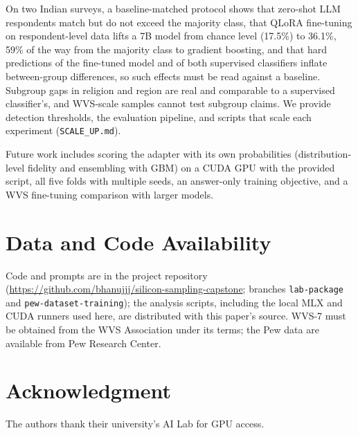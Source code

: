 \documentclass[conference]{IEEEtran}
\begin{document}
On two Indian surveys, a baseline-matched protocol shows that zero-shot LLM respondents match but do not exceed the majority class, that QLoRA fine-tuning on respondent-level data lifts a 7B model from chance level (17.5\%) to 36.1\%, 59\% of the way from the majority class to gradient boosting, and that hard predictions of the fine-tuned model and of both supervised classifiers inflate between-group differences, so such effects must be read against a baseline. Subgroup gaps in religion and region are real and comparable to a supervised classifier's, and WVS-scale samples cannot test subgroup claims. We provide detection thresholds, the evaluation pipeline, and scripts that scale each experiment (\texttt{SCALE\_UP.md}).

Future work includes scoring the adapter with its own probabilities (distribution-level fidelity and ensembling with GBM) on a CUDA GPU with the provided script, all five folds with multiple seeds, an answer-only training objective, and a WVS fine-tuning comparison with larger models.

\section*{Data and Code Availability}
Code and prompts are in the project repository (\url{https://github.com/bhanujjj/silicon-sampling-capstone}; branches \texttt{lab-package} and \texttt{pew-dataset-training}); the analysis scripts, including the local MLX and CUDA runners used here, are distributed with this paper's source. WVS-7 must be obtained from the WVS Association under its terms; the Pew data are available from Pew Research Center.

\section*{Acknowledgment}
The authors thank their university's AI Lab for GPU access.
\end{document}
